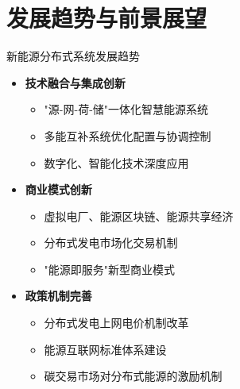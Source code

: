 \documentclass[aspectratio=169]{beamer}
\begin{document}
\section{发展趋势与前景展望}

\begin{frame}{新能源分布式系统发展趋势}
  \begin{itemize}
    \item \textbf{技术融合与集成创新}
      \begin{itemize}
        \item "源-网-荷-储"一体化智慧能源系统
        \item 多能互补系统优化配置与协调控制
        \item 数字化、智能化技术深度应用\cite{Li2024}
      \end{itemize}
    \item \textbf{商业模式创新}
      \begin{itemize}
        \item 虚拟电厂、能源区块链、能源共享经济
        \item 分布式发电市场化交易机制
        \item "能源即服务"新型商业模式
      \end{itemize}
    \item \textbf{政策机制完善}
      \begin{itemize}
        \item 分布式发电上网电价机制改革
        \item 能源互联网标准体系建设
        \item 碳交易市场对分布式能源的激励机制\cite{Wang2024}
      \end{itemize}
  \end{itemize}
\end{frame}
\end{document}
